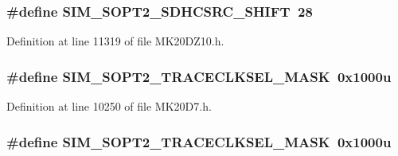 \subsubsection[{\texorpdfstring{S\+I\+M\+\_\+\+S\+O\+P\+T2\+\_\+\+S\+D\+H\+C\+S\+R\+C\+\_\+\+S\+H\+I\+FT}{SIM_SOPT2_SDHCSRC_SHIFT}}]{\setlength{\rightskip}{0pt plus 5cm}\#define S\+I\+M\+\_\+\+S\+O\+P\+T2\+\_\+\+S\+D\+H\+C\+S\+R\+C\+\_\+\+S\+H\+I\+FT~28}\hypertarget{group___s_i_m___register___masks_gac0d4558ce58c6d9bf19af4f36c363562}{}\label{group___s_i_m___register___masks_gac0d4558ce58c6d9bf19af4f36c363562}


Definition at line 11319 of file M\+K20\+D\+Z10.\+h.

\subsubsection[{\texorpdfstring{S\+I\+M\+\_\+\+S\+O\+P\+T2\+\_\+\+T\+R\+A\+C\+E\+C\+L\+K\+S\+E\+L\+\_\+\+M\+A\+SK}{SIM_SOPT2_TRACECLKSEL_MASK}}]{\setlength{\rightskip}{0pt plus 5cm}\#define S\+I\+M\+\_\+\+S\+O\+P\+T2\+\_\+\+T\+R\+A\+C\+E\+C\+L\+K\+S\+E\+L\+\_\+\+M\+A\+SK~0x1000u}\hypertarget{group___s_i_m___register___masks_ga332894211abcda547cbf5d5093bd3f72}{}\label{group___s_i_m___register___masks_ga332894211abcda547cbf5d5093bd3f72}


Definition at line 10250 of file M\+K20\+D7.\+h.

\subsubsection[{\texorpdfstring{S\+I\+M\+\_\+\+S\+O\+P\+T2\+\_\+\+T\+R\+A\+C\+E\+C\+L\+K\+S\+E\+L\+\_\+\+M\+A\+SK}{SIM_SOPT2_TRACECLKSEL_MASK}}]{\setlength{\rightskip}{0pt plus 5cm}\#define S\+I\+M\+\_\+\+S\+O\+P\+T2\+\_\+\+T\+R\+A\+C\+E\+C\+L\+K\+S\+E\+L\+\_\+\+M\+A\+SK~0x1000u}\hypertarget{group___s_i_m___register___masks_ga332894211abcda547cbf5d5093bd3f72}{}\label{group___s_i_m___register___masks_ga332894211abcda547cbf5d5093bd3f72}


